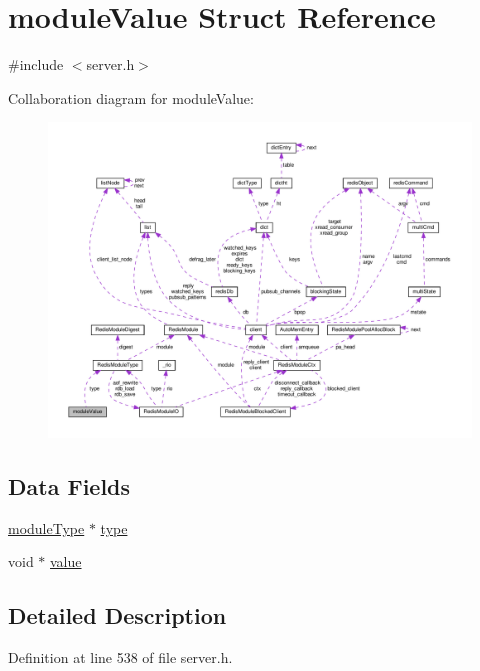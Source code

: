 \hypertarget{structmodule_value}{}\section{module\+Value Struct Reference}
\label{structmodule_value}


{\ttfamily \#include $<$server.\+h$>$}



Collaboration diagram for module\+Value\+:
\nopagebreak
\begin{figure}[H]
\begin{center}
\leavevmode
\includegraphics[width=350pt]{structmodule_value__coll__graph}
\end{center}
\end{figure}
\subsection*{Data Fields}
\begin{DoxyCompactItemize}
\item 
\hyperlink{server_8h_a3e81a33920e783a6b35dedfd7bdb6a2c}{module\+Type} $\ast$ \hyperlink{structmodule_value_a05eee39e39e34439ea77af35b597b1ae}{type}
\item 
void $\ast$ \hyperlink{structmodule_value_a0f61d63b009d0880a89c843bd50d8d76}{value}
\end{DoxyCompactItemize}


\subsection{Detailed Description}


Definition at line 538 of file server.\+h.



